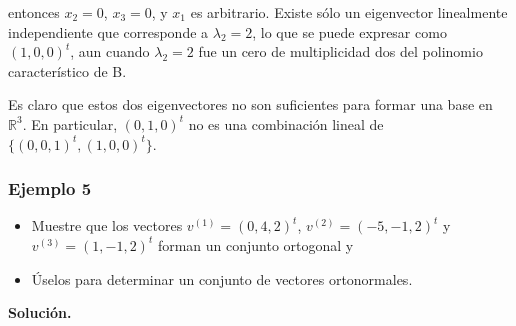 \documentclass{report}
\numberwithin{subsection}{section} %
\begin{document}
        entonces $x_2 = 0$, $x_3 = 0$, y $x_1$ es arbitrario. Existe sólo un eigenvector linealmente independiente que corresponde a $\lambda_2 = 2$, lo que se puede expresar como $(1, 0, 0)^t$, aun cuando $\lambda_2 = 2$ fue un cero de multiplicidad dos del polinomio característico de B.
    
        Es claro que estos dos eigenvectores no son suficientes para formar una base en $\mathbb{R}^3$. En particular, $(0, 1, 0)^t$ no es una combinación lineal de $\{(0, 0, 1)^t, (1, 0, 0)^t\}$.
        
\subsubsection*{Ejemplo 5}

\begin{itemize}
    \item Muestre que los vectores $v^{(1)} = (0, 4, 2)^t$, $v^{(2)} = (-5,-1, 2)^t$ y $v^{(3)} = (1,-1, 2)^t$ forman un conjunto ortogonal y
    \item Úselos para determinar un conjunto de vectores ortonormales.
\end{itemize}

{\bf Solución.}
\end{document}
